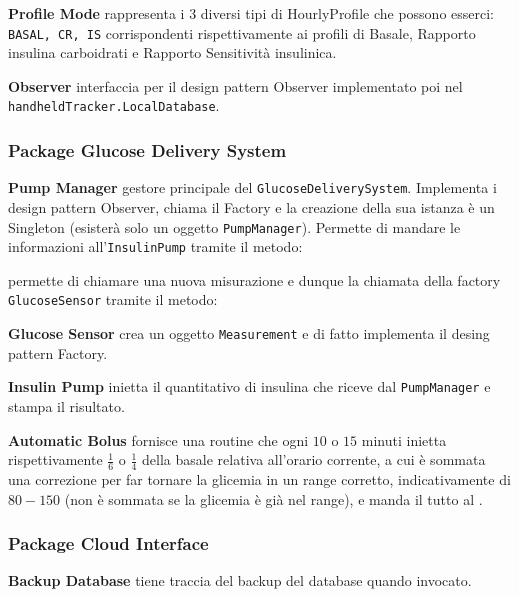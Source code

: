 \documentclass[twocolumn]{article}
\begin{document}


\noindent\textbf{Profile Mode}
\newline rappresenta i 3 diversi tipi di HourlyProfile che possono esserci: \texttt{BASAL, CR, IS} corrispondenti rispettivamente ai profili di Basale, Rapporto insulina carboidrati e Rapporto Sensitività insulinica.

\noindent\textbf{Observer}
\newline interfaccia per il design pattern Observer implementato poi nel \texttt{handheldTracker.LocalDatabase}.


\subsubsection{Package Glucose Delivery System}

\noindent\textbf{Pump Manager}
\newline gestore principale del \texttt{GlucoseDeliverySystem}. Implementa i design pattern Observer, chiama il Factory e la creazione della sua istanza è un Singleton (esisterà solo un oggetto \texttt{PumpManager}). Permette di mandare le informazioni all'\texttt{InsulinPump} tramite il metodo:

permette di chiamare una nuova misurazione e dunque la chiamata della factory \texttt{GlucoseSensor} tramite il metodo:


\noindent\textbf{Glucose Sensor}
\newline crea un oggetto \texttt{Measurement} e di fatto implementa il desing pattern Factory.

\noindent\textbf{Insulin Pump}
\newline inietta il quantitativo di insulina che riceve dal \texttt{PumpManager} e stampa il risultato.

\noindent\textbf{Automatic Bolus}
\newline 
fornisce una routine che ogni $10$ o $15$ minuti inietta rispettivamente $\frac{1}{6}$ o $\frac{1}{4}$ della basale relativa all'orario corrente, a cui è sommata una correzione per far tornare la glicemia in un range corretto, indicativamente di $80-150$ (non è sommata se la glicemia è già nel range), e manda il tutto al .


\subsubsection{Package Cloud Interface}

\noindent\textbf{Backup Database}
\newline tiene traccia del backup del database quando invocato.
\end{document}
